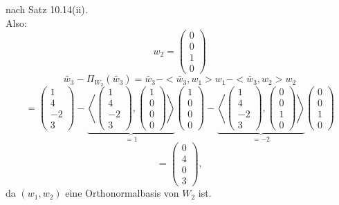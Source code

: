 \documentclass{scrbook}
\begin{document}
nach Satz 10.14(ii).\\
Also:
\[w_2 = 
\left(
\begin{array}{c}
0\\0\\1\\0
\end{array}
\right)\]
\[\tilde{w_3} - \Pi_{W_2}(\tilde{w_3} )= \tilde{w_3}-<\tilde{w_3},w_1>w_1-<\tilde{w_3},w_2>w_2\]
\[= \left(
\begin{array}{c}
1\\4\\-2\\3
\end{array}
\right)
-
\underbrace{\left<
\left(
\begin{array}{c}
1\\4\\-2\\3
\end{array}
\right)
,
\left(
\begin{array}{c}
1\\0\\0\\0
\end{array}
\right)
\right>}
_{=1}
\left(
\begin{array}{c}
1\\0\\0\\0
\end{array}
\right)
-
\underbrace{\left<
\left(
\begin{array}{c}
1\\4\\-2\\3
\end{array}
\right)
,
\left(
\begin{array}{c}
0\\0\\1\\0
\end{array}
\right)
\right>}
_{=-2}
\left(
\begin{array}{c}
0\\0\\1\\0
\end{array}
\right)
\]
\[
=\left(
\begin{array}{c}
0\\4\\0\\3
\end{array}
\right),
\]
da $(w_1,w_2)$ eine Orthonormalbasis von $W_2$ ist.\\
\end{document}
